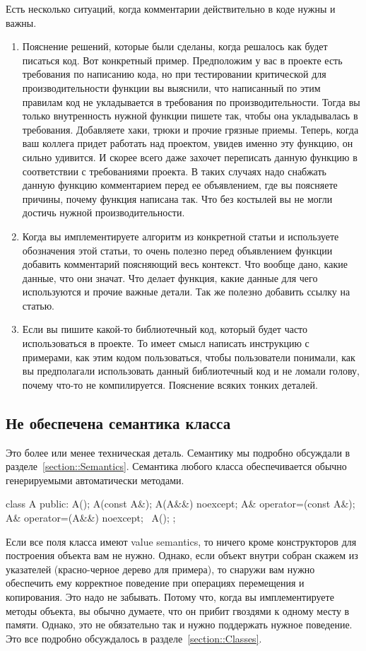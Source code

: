 Есть несколько ситуаций, когда комментарии действительно в коде нужны и важны.
\begin{enumerate}
\item Пояснение решений, которые были сделаны, когда решалось как будет писаться код.
Вот конкретный пример.
Предположим у вас в проекте есть требования по написанию кода, но при тестировании критической для производительности функции вы выяснили, что написанный по этим правилам код не укладывается в требования по производительности.
Тогда вы только внутренность нужной функции пишете так, чтобы она укладывалась в требования.
Добавляете хаки, трюки и прочие грязные приемы.
Теперь, когда ваш коллега придет работать над проектом, увидев именно эту функцию, он сильно удивится.
И скорее всего даже захочет переписать данную функцию в соответствии с требованиями проекта.
В таких случаях надо снабжать данную функцию комментарием перед ее объявлением, где вы поясняете причины, почему функция написана так.
Что без костылей вы не могли достичь нужной производительности.

\item Когда вы имплементируете алгоритм из конкретной статьи и используете обозначения этой статьи, то очень полезно перед объявлением функции добавить комментарий поясняющий весь контекст.
Что вообще дано, какие данные, что они значат.
Что делает функция, какие данные для чего используются и прочие важные детали.
Так же полезно добавить ссылку на статью.

\item Если вы пишите какой-то библиотечный код, который будет часто использоваться в проекте.
То имеет смысл написать инструкцию с примерами, как этим кодом пользоваться, чтобы пользователи понимали, как вы предполагали использовать данный библиотечный код и не ломали голову, почему что-то не компилируется.
Пояснение всяких тонких деталей.
\end{enumerate}

\subsection{Не обеспечена семантика класса}

Это более или менее техническая деталь.
Семантику мы подробно обсуждали в разделе~\ref{section::Semantics}.
Семантика любого класса обеспечивается обычно генерируемыми автоматически методами.
\begin{cppcode}
class A {
public:
  A();
  A(const A&);
  A(A&&) noexcept;
  A& operator=(const A&);
  A& operator=(A&&) noexcept;
  ~A();
};
\end{cppcode}
Если все поля класса имеют value semantics, то ничего кроме конструкторов для построения объекта вам не нужно.
Однако, если объект внутри собран скажем из указателей (красно-черное дерево для примера), то снаружи вам нужно обеспечить ему корректное поведение при операциях перемещения и копирования.
Это надо не забывать.
Потому что, когда вы имплементируете методы объекта, вы обычно думаете, что он прибит гвоздями к одному месту в памяти.
Однако, это не обязательно так и нужно поддержать нужное поведение.
Это все подробно обсуждалось в разделе~\ref{section::Classes}.
